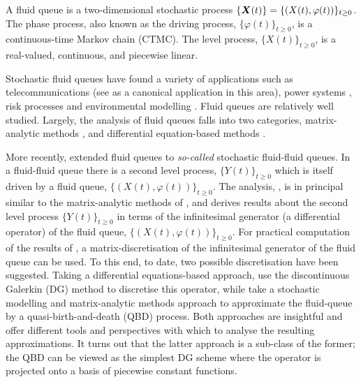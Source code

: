 		
A fluid queue is a two-dimensional stochastic process \(\{\boldsymbol X(t)\} = \{(X(t),\varphi(t))\}_{t\geq0}\). The phase process, also known as the driving process, \(\{\varphi(t)\}_{t\geq0}\), is a continuous-time Markov chain (CTMC). The level process, \(\{X(t)\}_{t\geq0}\), is a real-valued, continuous, and piecewise linear. 

Stochastic fluid queues have found a variety of applications such as telecommunications (see \cite{anick1982} as a canonical application in this area), power systems \citep{hydro}, risk processes \citep{betal2005} and environmental modelling \citep{wurm2020}. Fluid queues are relatively well studied. Largely, the analysis of fluid queues falls into two categories, matrix-analytic methods \citep{ajr2005,ar2003,ar2004,bean2005b,bean2005,bot08,bean2009,dasilva2005,latouche2018}, and differential equation-based methods \citep{anick1982,kk1995,beanetal2019}. %

More recently, \cite{bo2014} extended fluid queues to \emph{so-called} stochastic fluid-fluid queues. In a fluid-fluid queue there is a second level process, \(\{Y(t)\}_{t\geq0}\) which is itself driven by a fluid queue, \(\{(X(t),\varphi(t))\}_{t\geq0}\). The analysis,  \citep{bo2014}, is in principal similar to the matrix-analytic methods of \citep{bean2005}, and derives results about the second level process \(\{Y(t)\}_{t\geq0}\) in terms of the infinitesimal generator (a differential operator) of the fluid queue, \(\{(X(t),\varphi(t))\}_{t\geq0}\). For practical computation of the results of \cite{bo2014}, a matrix-discretisation of the infinitesimal generator of the fluid queue can be used. To this end, to date, two possible discretisation have been suggested. Taking a differential equations-based approach, \cite{beanetal2019} use the discontinuous Galerkin (DG) method to discretise this operator, while \cite{bo2013} take a stochastic modelling and matrix-analytic methods approach to approximate the fluid-queue by a quasi-birth-and-death (QBD) process. Both approaches are insightful and offer different tools and perspectives with which to analyse the resulting approximations. It turns out that the latter approach is a sub-class of the former; the QBD can be viewed as the simplest DG scheme where the operator is projected onto a basis of piecewise constant functions.

